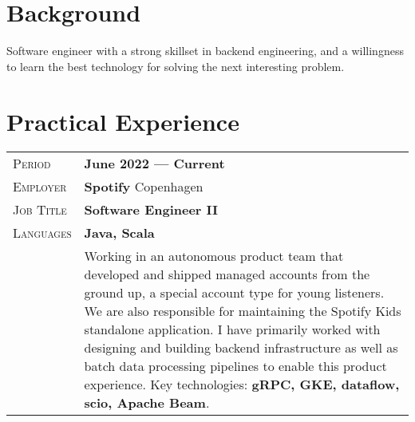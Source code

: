\documentclass[a4paper, oneside, final]{scrartcl} %
\newcommand{\gray}{\rowcolor[gray]{.90}} %
\begin{document}
\begin{center} %


{\fontsize{36}{36}\selectfont\scshape{}} %

\vspace{1.5cm} %


\section{Background}

Software engineer with a strong skillset in backend engineering, and a willingness to learn the best technology for solving the next interesting problem.


\section{Practical Experience}

\begin{tabularx}{0.97\linewidth}{>{\raggedleft\scshape}p{2cm}X}
\gray Period & \textbf{June 2022 --- Current}\\
\gray Employer & \textbf{Spotify} \hfill Copenhagen\\
\gray Job Title & \textbf{Software Engineer II}\\
\gray Languages & \textbf{Java, Scala}\\
       &  Working in an autonomous product team that developed and shipped managed accounts from the ground up, a special account type for young listeners. We are also responsible for maintaining the Spotify Kids standalone application. I have primarily worked with designing and building backend infrastructure as well as batch data processing pipelines to enable this product experience. Key technologies: \textbf{gRPC, GKE, dataflow, scio, Apache Beam}.
\end{tabularx}


\end{center}
\end{document}

